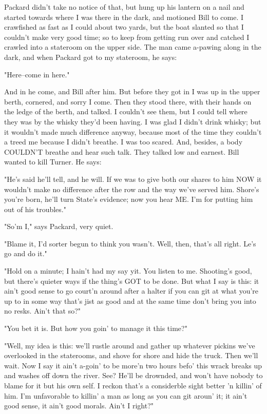 Packard didn't take no notice of that, but hung up his lantern on a nail
and started towards where I was there in the dark, and motioned Bill to
come.  I crawfished as fast as I could about two yards, but the boat
slanted so that I couldn't make very good time; so to keep from getting
run over and catched I crawled into a stateroom on the upper side.  The
man came a-pawing along in the dark, and when Packard got to my
stateroom, he says:

"Here--come in here."

And in he come, and Bill after him.  But before they got in I was up in
the upper berth, cornered, and sorry I come.  Then they stood there, with
their hands on the ledge of the berth, and talked.  I couldn't see them,
but I could tell where they was by the whisky they'd been having.  I was
glad I didn't drink whisky; but it wouldn't made much difference anyway,
because most of the time they couldn't a treed me because I didn't
breathe.  I was too scared.  And, besides, a body COULDN'T breathe and
hear such talk.  They talked low and earnest.  Bill wanted to kill
Turner.  He says:

"He's said he'll tell, and he will.  If we was to give both our shares to
him NOW it wouldn't make no difference after the row and the way we've
served him.  Shore's you're born, he'll turn State's evidence; now you
hear ME.  I'm for putting him out of his troubles."

"So'm I," says Packard, very quiet.

"Blame it, I'd sorter begun to think you wasn't.  Well, then, that's all
right.  Le's go and do it."

"Hold on a minute; I hain't had my say yit.  You listen to me.
Shooting's good, but there's quieter ways if the thing's GOT to be done.
But what I say is this:  it ain't good sense to go court'n around after a
halter if you can git at what you're up to in some way that's jist as
good and at the same time don't bring you into no resks.  Ain't that so?"

"You bet it is.  But how you goin' to manage it this time?"

"Well, my idea is this:  we'll rustle around and gather up whatever
pickins we've overlooked in the staterooms, and shove for shore and hide
the truck. Then we'll wait.  Now I say it ain't a-goin' to be more'n two
hours befo' this wrack breaks up and washes off down the river.  See?
He'll be drownded, and won't have nobody to blame for it but his own
self.  I reckon that's a considerble sight better 'n killin' of him.  I'm
unfavorable to killin' a man as long as you can git aroun' it; it ain't
good sense, it ain't good morals.  Ain't I right?"

